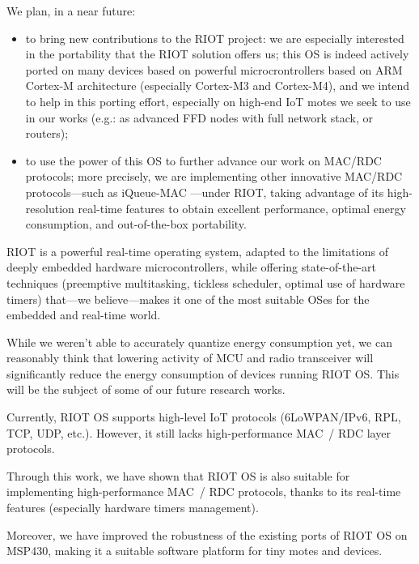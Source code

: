 \documentclass[a4paper,twoside]{article}
\begin{document}
We plan, in a near future:

\begin{itemize}

\item to bring new contributions to the RIOT project: we are especially
      interested in the portability that the RIOT solution offers us;
      this OS is indeed actively ported on many devices based on powerful
      microcrontrollers based on ARM Cortex-M architecture (especially
      Cortex-M3 and Cortex-M4), and we intend to help in this porting
      effort, especially on high-end IoT motes we seek to use in our
      works (e.g.: as advanced FFD nodes with full network stack,
      or routers);

\item to use the power of this OS to further advance our work on MAC/RDC
      protocols; more precisely, we are implementing other innovative
      MAC/RDC protocols---such as iQueue-MAC \cite{iQueueMAC}---under RIOT,
      taking advantage of its high-resolution real-time features to obtain
      excellent performance, optimal energy consumption, and out-of-the-box
      portability.

\end{itemize}

RIOT is a powerful real-time operating system, adapted to the limitations
of deeply embedded hardware microcontrollers, while offering state-of-the-art
techniques (preemptive multitasking, tickless scheduler, optimal use
of hardware timers) that---we believe---makes it one of the most
suitable OSes for the embedded and real-time world.

While we weren't able to accurately quantize energy consumption
yet, we can reasonably think that lowering activity of MCU and radio
transceiver will significantly reduce the energy consumption of devices
running RIOT OS. This will be the subject of some of our future
research works.

\bigskip

Currently, RIOT OS supports high-level IoT protocols (6LoWPAN/IPv6, RPL,
TCP, UDP, etc.). However, it still lacks high-performance MAC~/ RDC layer
protocols.

Through this work, we have shown that RIOT OS is also suitable for
implementing high-performance MAC~/ RDC protocols, thanks to its real-time
features (especially hardware timers management).

Moreover, we have improved the robustness of the existing ports of RIOT OS
on MSP430, making it a suitable software platform for tiny motes and devices.
\end{document}
